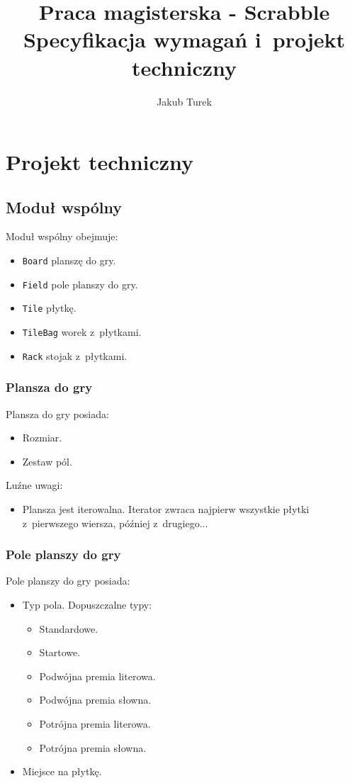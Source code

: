 \documentclass[a4paper,10pt]{report}
\title{Praca magisterska - Scrabble \\ \vspace{2mm} {\normalsize Specyfikacja wymagań i~projekt techniczny}}
\author{Jakub Turek}
\date{}
\begin{document}
\maketitle

\chapter{Projekt techniczny}

\section{Moduł wspólny}

Moduł wspólny obejmuje: 

\begin{itemize}
 \item \verb|Board| planszę do gry.
 \item \verb|Field| pole planszy do gry.
 \item \verb|Tile| płytkę.
 \item \verb|TileBag| worek z~płytkami.
 \item \verb|Rack| stojak z~płytkami.
\end{itemize}

\subsection{Plansza do gry}

Plansza do gry posiada:

\begin{itemize}
 \item Rozmiar.
 \item Zestaw pól.
\end{itemize}

Luźne uwagi:

\begin{itemize}
 \item Plansza jest iterowalna. Iterator zwraca najpierw wszystkie płytki z~pierwszego wiersza, później z~drugiego...
\end{itemize}

\subsection{Pole planszy do gry}

Pole planszy do gry posiada:

\begin{itemize}
 \item Typ pola. Dopuszczalne typy: 
	\begin{itemize}
		\item Standardowe.
		\item Startowe.
		\item Podwójna premia literowa.
		\item Podwójna premia słowna.
		\item Potrójna premia literowa.
		\item Potrójna premia słowna.
	\end{itemize}
 \item Miejsce na płytkę.
\end{itemize}
\end{document}
